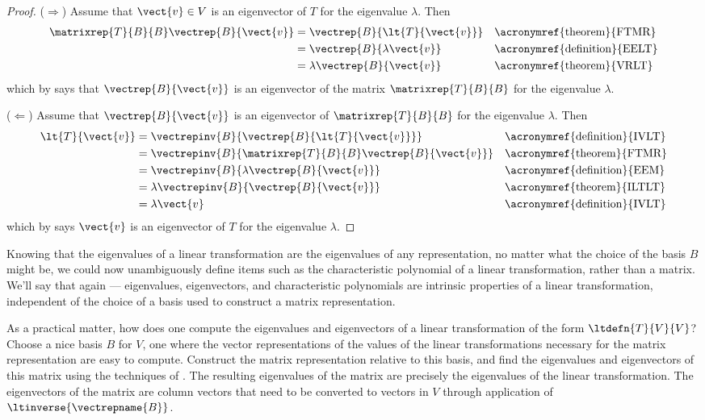 %
\begin{proof}
($\Rightarrow$) Assume that $\vect{v}\in V$ is an eigenvector of $T$ for the eigenvalue $\lambda$.  Then
%
\begin{align*}
\matrixrep{T}{B}{B}\vectrep{B}{\vect{v}}
&=\vectrep{B}{\lt{T}{\vect{v}}}&&\text{\acronymref{theorem}{FTMR}}\\
&=\vectrep{B}{\lambda\vect{v}}&&\text{\acronymref{definition}{EELT}}\\
&=\lambda\vectrep{B}{\vect{v}}&&\text{\acronymref{theorem}{VRLT}}
\end{align*}
%
which by  says that $\vectrep{B}{\vect{v}}$ is an eigenvector of the matrix $\matrixrep{T}{B}{B}$ for the eigenvalue $\lambda$.\par
%
($\Leftarrow$)  Assume that $\vectrep{B}{\vect{v}}$ is an eigenvector of $\matrixrep{T}{B}{B}$ for the eigenvalue $\lambda$.  Then
%
\begin{align*}
\lt{T}{\vect{v}}
&=\vectrepinv{B}{\vectrep{B}{\lt{T}{\vect{v}}}}&&\text{\acronymref{definition}{IVLT}}\\
&=\vectrepinv{B}{\matrixrep{T}{B}{B}\vectrep{B}{\vect{v}}}&&\text{\acronymref{theorem}{FTMR}}\\
&=\vectrepinv{B}{\lambda\vectrep{B}{\vect{v}}}&&\text{\acronymref{definition}{EEM}}\\
&=\lambda\vectrepinv{B}{\vectrep{B}{\vect{v}}}&&\text{\acronymref{theorem}{ILTLT}}\\
&=\lambda\vect{v}&&\text{\acronymref{definition}{IVLT}}
\end{align*}
%
which by  says $\vect{v}$ is an eigenvector of $T$ for the eigenvalue $\lambda$.
%
\end{proof}
%
%
Knowing that the eigenvalues of a linear transformation are the eigenvalues of any representation, no matter what the choice of the basis $B$ might be, we could now unambiguously define items such as the characteristic polynomial of a linear transformation, rather than a matrix.  We'll say that again --- eigenvalues, eigenvectors, and characteristic polynomials are intrinsic properties of a linear transformation, independent of the choice of a basis used to construct a matrix representation.\par
%
As a practical matter, how does one compute the eigenvalues and eigenvectors of a linear transformation of the form $\ltdefn{T}{V}{V}$?  Choose a nice basis $B$ for $V$, one where the vector representations of the values of the linear transformations necessary for the matrix representation are easy to compute.  Construct the matrix representation relative to this basis, and find the eigenvalues and eigenvectors of this matrix using the techniques of .  The resulting eigenvalues of the matrix are precisely the eigenvalues of the linear transformation.  The eigenvectors of the matrix are column vectors that need to be converted to vectors in $V$ through application of $\ltinverse{\vectrepname{B}}$.\par
